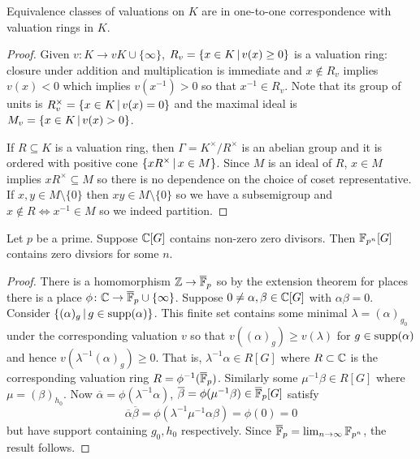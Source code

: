 \begin{proposition}
    Equivalence classes of valuations on $K$ are in one-to-one correspondence with valuation rings in $K$.
\end{proposition}

\begin{proof}
    Given $v \colon K \to vK \cup \{\infty\}$, $R_v = \left\{ x \in K \,\middle|\,  v(x) \geq 0  \right\}$ is a valuation ring: closure under addition and multiplication is immediate and $x \notin R_v$ implies $v(x) < 0$ which implies $v(x^{-1}) > 0$ so that $x^{-1} \in R_v$.
    Note that its group of units is $R_v^\times = \left\{ x \in K \,\middle|\, v(x) = 0 \right\}$ and the maximal ideal is $M_v = \left\{ x \in K \,\middle|\, v(x) > 0 \right\}$.

    If $R \subseteq K$ is a valuation ring, then $\Gamma = K^\times / R^\times$ is an abelian group and it is ordered with positive cone $\left\{ x R^\times \,\middle|\, x \in M \right\}$.
    Since $M$ is an ideal of $R$, $x \in M$ implies $x R^\times \subseteq M$ so there is no dependence on the choice of coset representative.
    If $x, y \in M \setminus \{0\}$ then $xy \in M \setminus \{0\}$ so we have a subsemigroup and $x \notin R \Leftrightarrow x^{-1} \in M$ so we indeed partition.
\end{proof}

\begin{corollary}
    \label{corollary:zdc_char_0_from_char_p}
    Let $p$ be a prime.
    Suppose $\mathbb{C}[G]$ contains non-zero zero divisors.
    Then $\mathbb{F}_{p^n}[G]$ contains zero divsiors for some $n$.
\end{corollary}

\begin{proof}
    There is a homomorphism $\mathbb{Z} \to \overline{\mathbb{F}}_p$ so by the extension theorem for places there is a place $\phi \colon \mathbb{C} \to \overline{\mathbb{F}}_p \cup \{\infty\}$.
    Suppose $0 \neq \alpha, \beta \in \mathbb{C}[G]$ with $\alpha \beta = 0$.
    Consider $\left\{  (\alpha)_g  \,\middle|\,  g \in \operatorname{supp}(\alpha)  \right\}$.
    This finite set contains some minimal $\lambda = (\alpha)_{g_0}$ under the corresponding valuation $v$ so that $v((\alpha)_g) \geq v(\lambda)$ for $g \in \operatorname{supp}(\alpha)$ and hence $v(\lambda^{-1}(\alpha)_g) \geq 0$.
    That is, $\lambda^{-1} \alpha \in R[G]$ where $R \subset \mathbb{C}$ is the corresponding valuation ring $R = \phi^{-1}(\overline{\mathbb{F}}_p)$.
    Similarly some $\mu^{-1} \beta \in R[G]$ where $\mu = (\beta)_{h_0}$.
    Now $\overline{\alpha} = \phi(\lambda^{-1} \alpha)$, $\overline{\beta} = \phi(\mu^{-1} \beta) \in \overline{\mathbb{F}}_p[G]$ satisfy \[
        \overline{\alpha} \overline{\beta} = \phi(\lambda^{-1} \mu^{-1} \alpha \beta) = \phi(0) = 0
    \]
    but have support containing $g_0, h_0$ respectively.
    Since $\overline{\mathbb{F}}_p = \lim_{n \to \infty} \mathbb{F}_{p^n}$, the result follows.
\end{proof}

